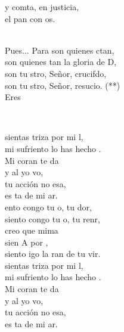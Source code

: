 \documentclass[12pt]{article}
\begin{document}
\begin{multicols*}{2}
\begin{cancion}
	y comta, en justicia, \\
	el pan con os.\\\jump\\
	\begin{chorus}%
	Pues... Para  son quienes ctan,\\
	son quienes tan la gloria de D,\\
	son tu stro, Señor, crucifdo,\\
	son tu stro, Señor, resucio. (**)\\
	Eres  \\
	\end{chorus}%
	\jump\\
\end{cancion}%

\begin{cancion}%
	 sientas  triza por mi l, \\
	mi sufriento lo has hecho . \\
\jump
	Mi coran te da \\
	y al yo vo, \\
	tu acción no esa,\\
	es ta de mi ar.\\
\jump
	ento congo tu o, tu dor,\\
	siento congo tu o, tu renr,\\
	creo que mima \\
	sien A por ,\\
	siento igo la ran de tu vir.\\
\jump
	 sientas  triza por mi l, \\
	mi sufriento lo has hecho . \\
\jump
	Mi coran te da \\
	y al yo vo, \\
	tu acción no esa,\\
	es ta de mi ar.\\
\end{cancion}%


\end{multicols*}
\end{document}
